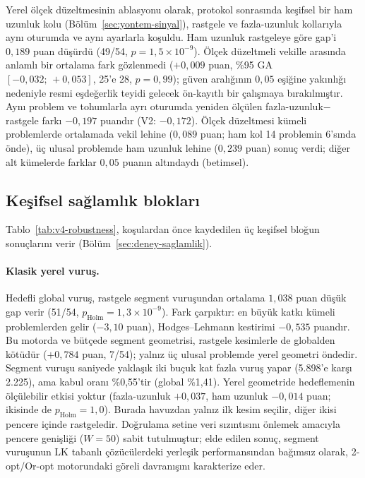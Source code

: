 \documentclass[pdflatex,sn-basic]{sn-jnl}
\begin{document}
Yerel ölçek düzeltmesinin ablasyonu olarak, protokol sonrasında keşifsel bir ham uzunluk kolu (Bölüm~\ref{sec:yontem-sinyal}), rastgele ve
fazla-uzunluk kollarıyla aynı oturumda ve aynı ayarlarla koşuldu. Ham uzunluk rastgeleye
göre gap'i $0{,}189$ puan düşürdü (49/54, $p=1{,}5\times10^{-9}$).
Ölçek düzeltmeli vekille arasında anlamlı bir ortalama fark gözlenmedi ($+0{,}009$ puan, \%95 GA
$[-0{,}032;\,+0{,}053]$, 25'e 28, $p=0{,}99$); güven aralığının $0{,}05$ eşiğine yakınlığı nedeniyle
resmi eşdeğerlik teyidi gelecek ön-kayıtlı bir çalışmaya bırakılmıştır.
Aynı problem ve tohumlarla ayrı oturumda yeniden ölçülen fazla-uzunluk$-$rastgele farkı
$-0{,}197$ puandır (V2: $-0{,}172$).
Ölçek düzeltmesi kümeli problemlerde ortalamada vekil lehine ($0{,}089$ puan; ham kol 14 problemin
6'sında önde), üç ulusal problemde ham uzunluk lehine ($0{,}239$ puan) sonuç verdi; diğer alt
kümelerde farklar $0{,}05$ puanın altındaydı (betimsel).

\subsection{Keşifsel sağlamlık blokları}\label{sec:bulgular-saglamlik}

Tablo~\ref{tab:v4-robustness}, koşulardan önce kaydedilen üç keşifsel bloğun sonuçlarını verir
(Bölüm~\ref{sec:deney-saglamlik}).

\paragraph{Klasik yerel vuruş.}
Hedefli global vuruş, rastgele segment vuruşundan ortalama $1{,}038$ puan düşük gap verir (51/54,
$p_{\mathrm{Holm}}=1{,}3\times10^{-9}$). Fark çarpıktır: en büyük katkı kümeli problemlerden gelir
($-3{,}10$ puan), Hodges--Lehmann kestirimi $-0{,}535$ puandır.
Bu motorda ve bütçede segment geometrisi, rastgele kesimlerle de globalden kötüdür ($+0{,}784$ puan,
7/54); yalnız üç ulusal problemde yerel geometri öndedir.
Segment vuruşu saniyede yaklaşık iki buçuk kat fazla vuruş yapar (5.898'e karşı 2.225), ama kabul
oranı \%0,55'tir (global \%1,41).
Yerel geometride hedeflemenin ölçülebilir etkisi yoktur (fazla-uzunluk $+0{,}037$, ham uzunluk
$-0{,}014$ puan; ikisinde de $p_{\mathrm{Holm}}=1{,}0$). Burada havuzdan yalnız ilk kesim seçilir,
diğer ikisi pencere içinde rastgeledir.
Doğrulama setine veri sızıntısını önlemek amacıyla pencere genişliği ($W=50$) sabit tutulmuştur;
elde edilen sonuç, segment vuruşunun LK tabanlı çözücülerdeki yerleşik performansından
\citep{applegate_2003_clk} bağımsız olarak, 2-opt/Or-opt motorundaki göreli davranışını karakterize eder.
\end{document}
